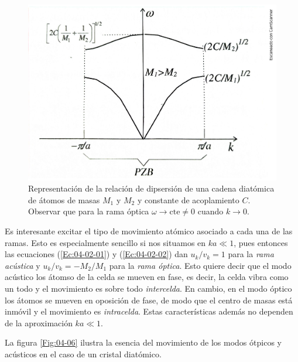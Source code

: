 \begin{figure}[h!] \centering
    \includegraphics[scale=0.43]{Cuerpo/Ch_04/Fotos libro 5.pdf}
    \caption{Representación de la relación de dipsersión de una cadena diatómica de átomos de masas $M_1$ y $M_2$ y constante de acoplamiento $C$. Observar que para la rama óptica $\omega \rightarrow \text{cte} \neq 0$ cuando $k\rightarrow 0$.}
    \label{Fig:04-05}
\end{figure}    

Es interesante excitar el tipo de movimiento atómico asociado a cada una de las ramas. Esto es especialmente sencillo si nos situamos en $ka\ll 1$, pues entonces las ecuaciones (\ref{Ec:04-02-01}) y (\ref{Ec:04-02-02}) dan $u_k/v_k=1$ para la \textit{rama acústica} y $u_k/v_k = -M_2/M_1$ para la \textit{rama óptica}. Esto quiere decir que el modo acústico los átomso de la celda se mueven en fase, es decir, la celda vibra como un todo y el movimiento es sobre todo \textit{intercelda}. En cambio, en el modo óptico los átomos se mueven en oposición de fase, de modo que el centro de masas está inmóvil y el movimiento es \textit{intracelda}. Estas características además no dependen de la aproximación $ka\ll 1$. 


La figura \ref{Fig:04-06} ilustra la esencia del movimiento de los modos ótpicos y acústicos en el caso de un cristal diatómico. 

